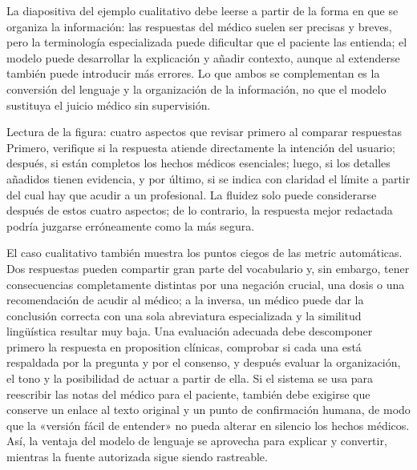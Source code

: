 
La diapositiva del ejemplo cualitativo debe leerse a partir de la forma en que se organiza la información: las respuestas del médico suelen ser precisas y breves, pero la terminología especializada puede dificultar que el paciente las entienda; el modelo puede desarrollar la explicación y añadir contexto, aunque al extenderse también puede introducir más errores. Lo que ambos se complementan es la conversión del lenguaje y la organización de la información, no que el modelo sustituya el juicio médico sin supervisión.

\begin{knowledgebox}{Lectura de la figura: cuatro aspectos que revisar primero al comparar respuestas}
Primero, verifique si la respuesta atiende directamente la intención del usuario; después, si están completos los hechos médicos esenciales; luego, si los detalles añadidos tienen evidencia, y por último, si se indica con claridad el límite a partir del cual hay que acudir a un profesional. La fluidez solo puede considerarse después de estos cuatro aspectos; de lo contrario, la respuesta mejor redactada podría juzgarse erróneamente como la más segura.
\end{knowledgebox}

El caso cualitativo también muestra los puntos ciegos de las metric automáticas. Dos respuestas pueden compartir gran parte del vocabulario y, sin embargo, tener consecuencias completamente distintas por una negación crucial, una dosis o una recomendación de acudir al médico; a la inversa, un médico puede dar la conclusión correcta con una sola abreviatura especializada y la similitud lingüística resultar muy baja. Una evaluación adecuada debe descomponer primero la respuesta en proposition clínicas, comprobar si cada una está respaldada por la pregunta y por el consenso, y después evaluar la organización, el tono y la posibilidad de actuar a partir de ella. Si el sistema se usa para reescribir las notas del médico para el paciente, también debe exigirse que conserve un enlace al texto original y un punto de confirmación humana, de modo que la «versión fácil de entender» no pueda alterar en silencio los hechos médicos. Así, la ventaja del modelo de lenguaje se aprovecha para explicar y convertir, mientras la fuente autorizada sigue siendo rastreable.

